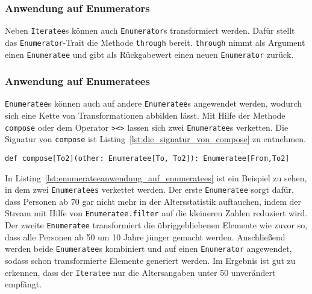 
\subsubsection{Anwendung auf Enumerators} %
\label{ssub:enumerateeanwendung_auf_enumerators}

Neben \lstinline|Iteratee|s können auch \lstinline|Enumerator|s transformiert werden.
Dafür stellt das \lstinline|Enumerator|-Trait die Methode \lstinline|through| bereit.
\lstinline|through| nimmt als Argument einen \lstinline|Enumeratee| und gibt als Rückgabewert einen neuen \lstinline|Enumerator| zurück.


\subsubsection{Anwendung auf Enumeratees} %
\label{ssub:enumerateeanwendung_auf_enumeratees}

\lstinline|Enumeratee|s können auch auf andere \lstinline|Enumeratee|s angewendet werden, wodurch sich eine Kette von Transformationen abbilden lässt.
Mit Hilfe der Methode \lstinline|compose| oder dem Operator \lstinline|><>| lassen sich zwei \lstinline|Enumeratee|s verketten.
Die Signatur von \lstinline|compose| ist Listing~\ref{lst:die_signatur_von_compose} zu entnehmen.
\begin{lstlisting}[caption=Die Signatur von compose, label=lst:die_signatur_von_compose]
def compose[To2](other: Enumeratee[To, To2]): Enumeratee[From,To2]
\end{lstlisting}

In Listing~\ref{lst:enumerateeanwendung_auf_enumeratees} ist ein Beispiel zu sehen, in dem zwei \lstinline|Enumeratees| verkettet werden.
Der erste \lstinline|Enumeratee| sorgt dafür, dass Personen ab 70 gar nicht mehr in der Altersstatistik auftauchen, indem der Stream mit Hilfe von \lstinline|Enumeratee.filter| auf die kleineren Zahlen reduziert wird.
Der zweite \lstinline|Enumeratee| transformiert die übriggebliebenen Elemente wie zuvor so, dass alle Personen ab 50 um 10 Jahre jünger gemacht werden.
Anschließend werden beide \lstinline|Enumeratee|s kombiniert und auf einen \lstinline|Enumerator| angewendet, sodass schon transformierte Elemente generiert werden.
Im Ergebnis ist gut zu erkennen, dass der \lstinline|Iteratee| nur die Altersangaben unter 50 unverändert empfängt.

